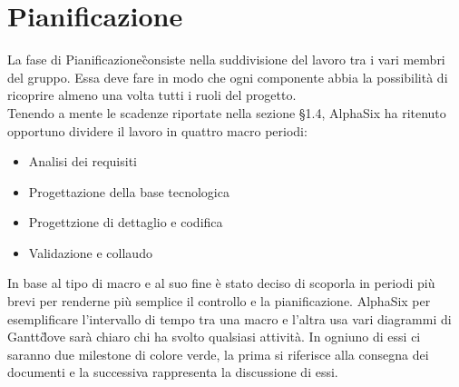 \newpage
\section{Pianificazione}\label{Pianificazione}
    La fase di Pianificazione\G consiste nella suddivisione del lavoro tra i vari membri del gruppo. Essa deve fare in modo che ogni componente abbia la possibilità di ricoprire almeno una volta tutti i ruoli del progetto.\\
    Tenendo a mente le scadenze riportate nella sezione §1.4,
     AlphaSix ha ritenuto opportuno dividere il lavoro in quattro
     macro periodi:
     \begin{itemize}
		\item Analisi dei requisiti
		\item Progettazione della base tecnologica
		\item Progettzione di dettaglio e codifica
		\item Validazione e collaudo
     \end{itemize}
    
    In base al tipo di macro e al suo fine è stato deciso di scoporla in periodi più brevi per renderne più semplice il
    controllo e la pianificazione. AlphaSix per esemplificare l'intervallo di tempo tra una macro e l'altra usa vari
    diagrammi di Gantt\G dove sarà chiaro chi ha svolto qualsiasi attività. In ogniuno di essi ci saranno due
    milestone di colore verde, la prima si riferisce alla consegna dei documenti e la successiva rappresenta la discussione di essi.


